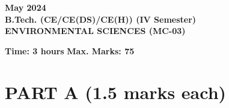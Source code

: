 \documentclass[12pt,a4paper]{article}
\begin{document}
\pagecolor{pagecolor}

\begin{center}
    \textbf{May 2024} \\
    \textbf{B.Tech. (CE/CE(DS)/CE(H)) (IV Semester)} \\
    \textbf{ENVIRONMENTAL SCIENCES (MC-03)}
\end{center}

\vspace{1em}

\noindent \textbf{Time: 3 hours} \hfill \textbf{Max. Marks: 75}

\vspace{1em}

\section*{\textbf{PART A (1.5 marks each)}}
\end{document}
